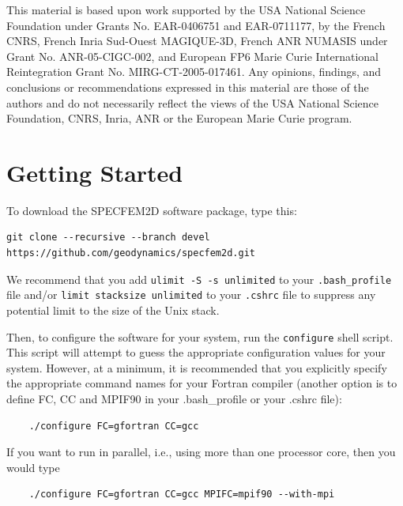 \documentclass[oneside,english,onecolumn,letterpaper]{book}
\begin{document}
This material is based upon work supported by the USA National Science
Foundation under Grants No. EAR-0406751 and EAR-0711177, by the French
CNRS, French Inria Sud-Ouest MAGIQUE-3D, French ANR NUMASIS under
Grant No. ANR-05-CIGC-002, and European FP6 Marie Curie International
Reintegration Grant No. MIRG-CT-2005-017461.
Any opinions, findings, and conclusions or recommendations expressed in this material are
those of the authors and do not necessarily reflect the views of the
USA National Science Foundation, CNRS, Inria, ANR or the European
Marie Curie program.




\chapter{\label{cha:Getting-Started}Getting Started}


To download the SPECFEM2D software package, type this:
\begin{verbatim}
git clone --recursive --branch devel https://github.com/geodynamics/specfem2d.git
\end{verbatim}

We recommend that you add \texttt{ulimit -S -s unlimited} to your \texttt{.bash\_profile} file and/or \texttt{limit stacksize unlimited} to your \texttt{.cshrc} file to suppress any potential limit to the size of the Unix stack.

Then, to configure the software for your system, run the
\texttt{configure} shell script. This script will attempt to guess
the appropriate configuration values for your system. However, at
a minimum, it is recommended that you explicitly specify the appropriate
command names for your Fortran compiler (another option is to define FC, CC and MPIF90 in your .bash\_profile
or your .cshrc file):
%
\begin{verbatim}
    ./configure FC=gfortran CC=gcc
\end{verbatim}
%
If you want to run in parallel, i.e., using more than one processor core, then you would type
%
\begin{verbatim}
    ./configure FC=gfortran CC=gcc MPIFC=mpif90 --with-mpi
\end{verbatim}
\end{document}
